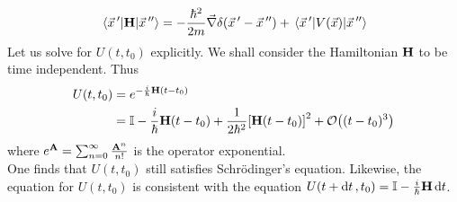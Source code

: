 \documentclass[12pt,a4paper,titlepage]{article}
\begin{document}
\begin{equation}
\begin{aligned}
\mel{\vec{x}\,'}{\vb{H}}{\vec{x}\,''}=-\frac{\hbar^{2}}{2m}\vec{\nabla}\delta(\vec{x}\,'-\vec{x}\,'')+\mel{\vec{x}\,'}{V(\vec{x})}{\vec{x}\,''}
\end{aligned}
\end{equation}
Let us solve for $U(t,t_{0})$ explicitly. We shall consider the Hamiltonian $\vb{H}$ to be time independent. Thus
\begin{equation}
\begin{aligned}
U(t,t_{0})&=e^{-\frac{i}{\hbar}\vb{H}(t-t_{0})}\\
&=\mathbb{I}-\frac{i}{\hbar}\vb{H}(t-t_{0})+\frac{1}{2\hbar^{2}}\qty[\vb{H}(t-t_{0})]^{2}+\order{(t-t_{0})^{3}}
\end{aligned}
\end{equation}
where $e^{\vb{A}}=\sum_{n=0}^{\infty}\frac{\vb{A}^{n}}{n!}$ is the operator exponential.\\

One finds that $U(t,t_{0})$ still satisfies Schr\"{o}dinger's equation. Likewise, the equation for $U(t,t_{0})$ is consistent with the equation $U(t+\dd{t},t_{0})=\mathbb{I}-\frac{i}{\hbar}\vb{H}\dd{t}$.\\
\end{document}
